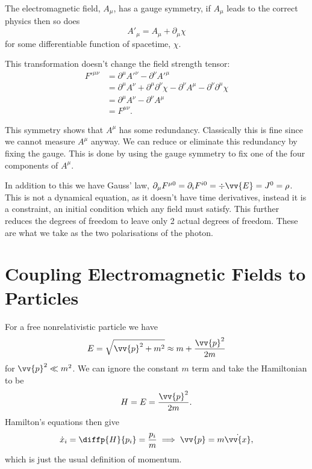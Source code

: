 \documentclass[fleqn]{NotesClass}
\begin{document}
    The electromagnetic field, \(A_\mu\), has a gauge symmetry, if \(A_\mu\) leads to the correct physics then so does
    \begin{equation}
        A'_\mu = A_\mu + \partial_\mu \chi
    \end{equation}
    for some differentiable function of spacetime, \(\chi\).
    
    This transformation doesn't change the field strength tensor:
    \begin{align}
        F'^{\mu\nu} &= \partial^\mu A'^\nu - \partial^\nu A'^\mu\\
        &= \partial^\mu A^\nu + \partial^\mu \partial^\nu \chi - \partial^\nu A^\mu - \partial^\nu \partial^\mu \chi\\
        &= \partial^\mu A^\nu - \partial^\nu A^\mu\\
        &= F^{\mu\nu}.
    \end{align}
    
    This symmetry shows that \(A^\mu\) has some redundancy.
    Classically this is fine since we cannot measure \(A^\mu\) anyway.
    We can reduce or eliminate this redundancy by fixing the gauge.
    This is done by using the gauge symmetry to fix one of the four components of \(A^\mu\).
    
    In addition to this we have Gauss' law, \(\partial_\mu F^{\mu 0} = \partial_i F^{i0} = \div \vv{E} = J^0 = \rho\).
    This is not a dynamical equation, as it doesn't have time derivatives, instead it is a constraint, an initial condition which any field must satisfy.
    This further reduces the degrees of freedom to leave only 2 actual degrees of freedom.
    These are what we take as the two polarisations of the photon.
    
    \section{Coupling Electromagnetic Fields to Particles}
    For a free nonrelativistic particle we have
    \begin{equation}
        E = \sqrt{\vv{p}^2 + m^2} \approx m + \frac{\vv{p}^2}{2m}
    \end{equation}
    for \(\vv{p}^2 \ll m^2\).
    We can ignore the constant \(m\) term and take the Hamiltonian to be
    \begin{equation}
        H = E = \frac{\vv{p}^2}{2m}.
    \end{equation}
    Hamilton's equations then give
    \begin{equation}
        \dot{x}_i = \diffp{H}{p_i} = \frac{p_i}{m} \implies \vv{p} = m\dot{\vv{x}},
    \end{equation}
    which is just the usual definition of momentum.
    
\end{document}
